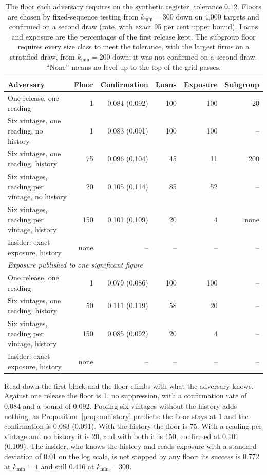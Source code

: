 \begin{table}[ht]
\centering
\caption{The floor each adversary requires on the synthetic register, tolerance 0.12.
Floors are chosen by fixed-sequence testing from $k_{\min}=300$ down on 4{,}000
targets and confirmed on a second draw (rate, with exact 95 per cent upper bound).
Loans and exposure are the percentages of the first release kept. The subgroup floor
requires every size class to meet the tolerance, with the largest firms on a
stratified draw, from $k_{\min}=200$ down; it was not confirmed on a second draw.
``None'' means no level up to the top of the grid passes.}
\label{c13:tab-floors}
\small\setlength{\tabcolsep}{3pt}
\begin{tabular}{lrrrrr}
\toprule
Adversary & Floor & Confirmation & Loans & Exposure & Subgroup \\
\midrule
One release, one reading                      & 1    & 0.084 (0.092) & 100 & 100 & 20 \\
Six vintages, one reading, no history         & 1    & 0.083 (0.091) & 100 & 100 & -- \\
Six vintages, one reading, history            & 75   & 0.096 (0.104) & 45  & 11  & 200 \\
Six vintages, reading per vintage, no history & 20   & 0.105 (0.114) & 85  & 52  & -- \\
Six vintages, reading per vintage, history    & 150  & 0.101 (0.109) & 20  & 4   & none \\
Insider: exact exposure, history              & none & --            & --  & --  & -- \\
\midrule
\multicolumn{6}{l}{\emph{Exposure published to one significant figure}}\\
One release, one reading                      & 1    & 0.079 (0.086) & 100 & 100 & -- \\
Six vintages, one reading, history            & 50   & 0.111 (0.119) & 58  & 20  & -- \\
Six vintages, reading per vintage, history    & 150  & 0.085 (0.092) & 20  & 4   & -- \\
Insider: exact exposure, history              & none & --            & --  & --  & -- \\
\bottomrule
\end{tabular}
\end{table}

Read down the first block and the floor climbs with what the adversary knows. Against
one release the floor is 1, no suppression, with a confirmation rate of 0.084 and a
bound of 0.092. Pooling six vintages without the history adds nothing, as
Proposition~\ref{prop:nohistory} predicts: the floor stays at 1 and the confirmation
is 0.083 (0.091). With the history the floor is 75. With a reading per vintage and no
history it is 20, and with both it is 150, confirmed at 0.101 (0.109). The insider,
who knows the history and reads exposure with a standard deviation of 0.01 on the log
scale, is not stopped by any floor: its success is 0.772 at $k_{\min}=1$ and still
0.416 at $k_{\min}=300$.

